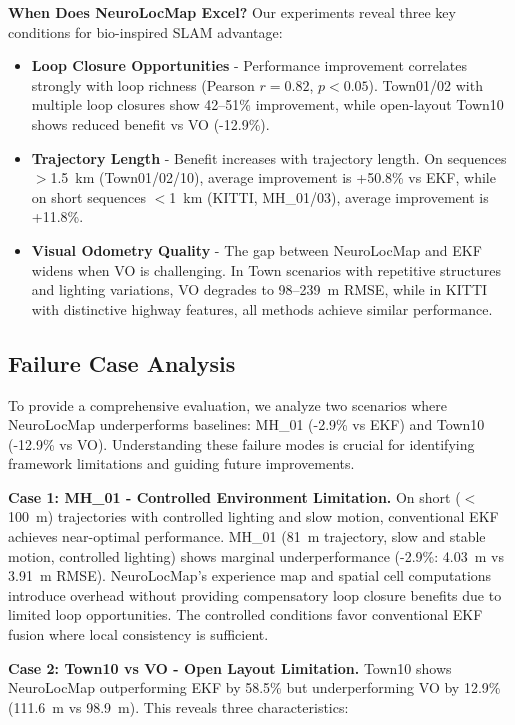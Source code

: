 \textbf{When Does NeuroLocMap Excel?} Our experiments reveal three key conditions for bio-inspired SLAM advantage:

\begin{itemize}
    \item \textbf{Loop Closure Opportunities} - Performance improvement correlates strongly with loop richness (Pearson $r=0.82$, $p<0.05$). Town01/02 with multiple loop closures show 42--51\% improvement, while open-layout Town10 shows reduced benefit vs VO (-12.9\%).

    \item \textbf{Trajectory Length} - Benefit increases with trajectory length. On sequences $>$1.5~km (Town01/02/10), average improvement is +50.8\% vs EKF, while on short sequences $<$1~km (KITTI, MH\_01/03), average improvement is +11.8\%.

    \item \textbf{Visual Odometry Quality} - The gap between NeuroLocMap and EKF widens when VO is challenging. In Town scenarios with repetitive structures and lighting variations, VO de\-grades to 98--239~m RMSE, while in KITTI with distinctive highway features, all methods achieve similar per\-for\-mance.
\end{itemize}

\subsection{Failure Case Analysis}
\label{sec:failure_analysis}

To provide a comprehensive evaluation, we analyze two scenarios where NeuroLocMap un\-der\-per\-forms baselines: MH\_01 (-2.9\% vs EKF) and Town10 (-12.9\% vs VO). Understanding these failure modes is crucial for identifying framework limitations and guiding future improvements.

\textbf{Case 1: MH\_01 - Controlled Environment Limitation.} On short ($<$100~m) trajectories with controlled lighting and slow motion, conventional EKF achieves near-optimal per\-for\-mance. MH\_01 (81~m trajectory, slow and stable motion, controlled lighting) shows marginal underperformance (-2.9\%: 4.03~m vs 3.91~m RMSE). NeuroLocMap's experience map and spatial cell computations introduce overhead without providing compensatory loop closure benefits due to limited loop op\-por\-tu\-ni\-ties. The controlled conditions favor conventional EKF fusion where local consistency is sufficient.

\textbf{Case 2: Town10 vs VO - Open Layout Limitation.} Town10 shows NeuroLocMap outperforming EKF by 58.5\% but underperforming VO by 12.9\% (111.6~m vs 98.9~m). This reveals three characteristics:

